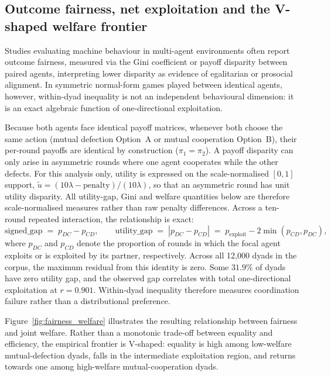 \documentclass[11pt,a4paper]{article}
\begin{document}
\subsection{Outcome fairness, net exploitation and the V-shaped welfare frontier}\label{appendix:fairness_welfare}

Studies evaluating machine behaviour in multi-agent environments often report
outcome fairness, measured via the Gini coefficient or payoff disparity between
paired agents, interpreting lower disparity as evidence of egalitarian or
prosocial alignment. In symmetric normal-form games played between identical
agents, however, within-dyad inequality is not an independent behavioural
dimension: it is an exact algebraic function of one-directional exploitation.

Because both agents face identical payoff matrices, whenever both choose the
same action (mutual defection Option~A or mutual cooperation Option~B), their
per-round payoffs are identical by construction ($\pi_1 = \pi_2$). A payoff
disparity can only arise in asymmetric rounds where one agent cooperates while
the other defects. For this analysis only, utility is expressed on the
scale-normalised $[0,1]$ support,
$\tilde u=(10\lambda-\mathrm{penalty})/(10\lambda)$, so that an asymmetric
round has unit utility disparity. All utility-gap, Gini and welfare quantities
below are therefore scale-normalised measures rather than raw penalty
differences. Across a ten-round repeated interaction, the relationship is exact:
\begin{equation}
\text{signed\_gap} \;=\; p_{DC} - p_{CD}, \qquad
\text{utility\_gap} \;=\; |p_{DC} - p_{CD}| \;=\; p_{\text{exploit}} - 2 \min(p_{CD}, p_{DC}),
\label{eq:fairness_identity}
\end{equation}
where $p_{DC}$ and $p_{CD}$ denote the proportion of rounds in which the focal
agent exploits or is exploited by its partner, respectively. Across all
12{,}000 dyads in the corpus, the maximum residual from this identity is zero.
Some $31.9\%$ of dyads have zero utility gap, and the observed gap correlates
with total one-directional exploitation at $r = 0.901$. Within-dyad inequality
therefore measures coordination failure rather than a distributional preference.

Figure~\ref{fig:fairness_welfare} illustrates the resulting relationship between
fairness and joint welfare. Rather than a monotonic trade-off between equality
and efficiency, the empirical frontier is V-shaped: equality is high among
low-welfare mutual-defection dyads, falls in the intermediate exploitation
region, and returns towards one among high-welfare mutual-cooperation dyads.
\end{document}
